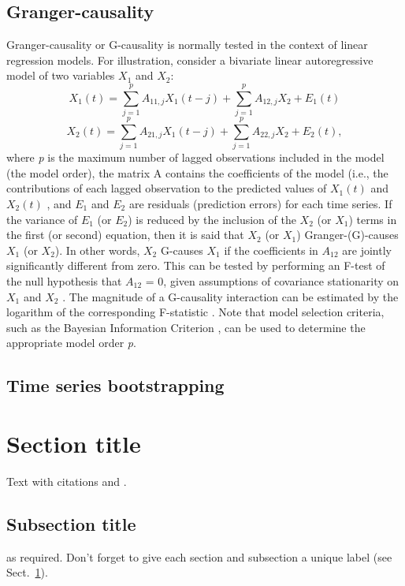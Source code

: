 \subsection{Granger-causality}
    Granger-causality or G-causality is normally tested in the context of linear regression models. For illustration, consider a bivariate linear autoregressive model of two variables $X_1$ and $X_2$:
    \begin{equation}
        X_1(t)= \sum^{p}_{j=1}A_{11,j}X_{1}(t-j) + \sum^{p}_{j=1}A_{12,j}X_{2}+E_1(t)
    \end{equation} 
    \begin{equation}
        X_2(t)= \sum^{p}_{j=1}A_{21,j}X_{1}(t-j) + \sum^{p}_{j=1}A_{22,j}X_{2}+E_2(t),
    \end{equation}
    where \textit{p} is the maximum number of lagged observations included in the model (the model order), the matrix A contains the coefficients of the model (i.e., the contributions of each lagged observation to the predicted values of $X_1(t)$ and $X_2(t)$ , and $E_1$ and $E_2$ are residuals (prediction errors) for each time series. If the variance of $E_1$ (or $E_2$) is reduced by the inclusion of the $X_2$ (or $X_1$) terms in the first (or second) equation, then it is said that $X_2$ (or $X_1$) Granger-(G)-causes $X_1$ (or $X_2$). In other words, $X_2$ G-causes $X_1$ if the coefficients in $A_{12}$ are jointly significantly different from zero. This can be tested by performing an F-test of the null hypothesis that $A_{12}$ = 0, given assumptions of covariance stationarity on $X_1$ and $X_2$ . The magnitude of a G-causality interaction can be estimated by the logarithm of the corresponding F-statistic \cite{Ref_4}. Note that model selection criteria, such as the Bayesian Information Criterion \cite{Ref_5}, can be used to determine the appropriate model order \textit{p}.

\subsection{Time series bootstrapping}
    

\section{Section title}
\label{sec:1}
Text with citations \cite{RefB} and \cite{RefJ}.
\subsection{Subsection title}
\label{sec:2}
as required. Don't forget to give each section
and subsection a unique label (see Sect.~\ref{sec:1}).
